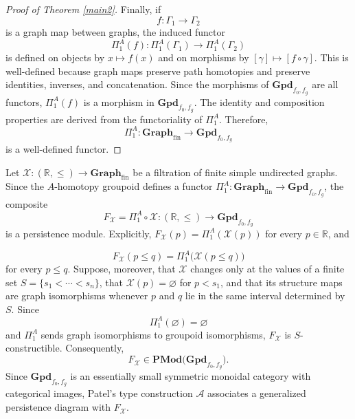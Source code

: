 \documentclass{amsart}
\begin{document}
\begin{proof}[Proof of Theorem \ref{main2}]
Finally, if
\[
f\colon \Gamma_1\longrightarrow \Gamma_2
\]
is a graph map between graphs, the induced functor
\[
\Pi_1^A(f)\colon\Pi_1^A(\Gamma_1)\longrightarrow\Pi_1^A(\Gamma_2)
\]
is defined on objects by
$x\longmapsto f(x)$
and on morphisms by $[\gamma]\longmapsto[f\circ\gamma].$
This is well-defined because graph maps preserve path homotopies and
 preserve identities, inverses, and concatenation. Since the
morphisms of $\mathbf{Gpd}_{f_0,f_g}$ are all functors, $\Pi_1^A(f)$
is a morphism in $\mathbf{Gpd}_{f_0,f_g}$. The identity and composition properties are derived from the functoriality of $\Pi_1^A$. Therefore,
\[
\Pi_1^A\colon
\mathbf{Graph}_{\mathrm{fin}}
\longrightarrow
\mathbf{Gpd}_{f_0,f_g}
\]
is a well-defined functor.
\end{proof}

Let $\mathcal{X}\colon(\mathbb{R},\leq)\longrightarrow \mathbf{Graph}_{\mathrm{fin}}$ be a filtration of finite simple undirected graphs. Since the $A$-homotopy groupoid defines a functor $\Pi_1^A\colon\mathbf{Graph}_{\mathrm{fin}} \longrightarrow\mathbf{Gpd}_{f_0,f_g}$, the composite
$$
F_{\mathcal{X}}
=
\Pi_1^A\circ\mathcal{X}\colon
(\mathbb{R},\leq)
\longrightarrow
\mathbf{Gpd}_{f_0,f_g}
$$
is a persistence module. Explicitly, $F_{\mathcal{X}}(p)=\Pi_1^A(\mathcal{X}(p))$ for every \(p\in\mathbb{R}\), and

$$
F_{\mathcal{X}}(p\leq q)
=
\Pi_1^A\bigl(\mathcal{X}(p\leq q)\bigr)
$$
for every \(p\leq q\). Suppose, moreover, that \(\mathcal{X}\) changes only at the values of a finite set $S=\{s_1<\cdots<s_n\}$,
 that $\mathcal{X}(p)=\varnothing$ for $p<s_1$, and that its structure maps are graph isomorphisms whenever $p$ and $q$ lie in the same interval determined by $S$. Since
$$
\Pi_1^A(\varnothing)=\varnothing
$$
and $\Pi_1^A$ sends graph isomorphisms to groupoid isomorphisms, $F_{\mathcal{X}}$ is $S$-constructible. Consequently,$$
F_{\mathcal{X}}
\in
\mathbf{PMod}\bigl(\mathbf{Gpd}_{f_0,f_g}\bigr).
$$
Since \(\mathbf{Gpd}_{f_0,f_g}\) is an essentially small symmetric monoidal category with categorical images, Patel's type construction $\mathcal A$ associates a generalized persistence diagram with $F_{\mathcal{X}}$.
\end{document}
